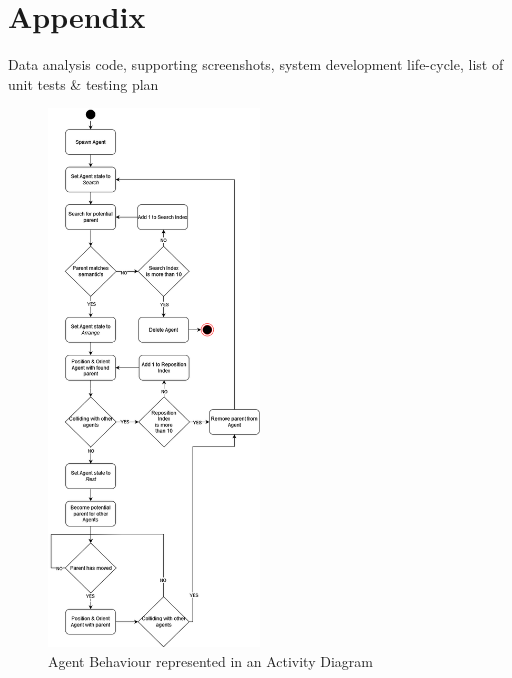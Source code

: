 \section{Appendix}

Data analysis code, supporting screenshots, system development life-cycle, list of unit tests \& testing plan


\begin{figure}[ht]
    \includegraphics[width=0.5\textwidth]{./Images/AgentActivityDiagram.png}
    \centering
    \caption{Agent Behaviour represented in an Activity Diagram}
\end{figure}